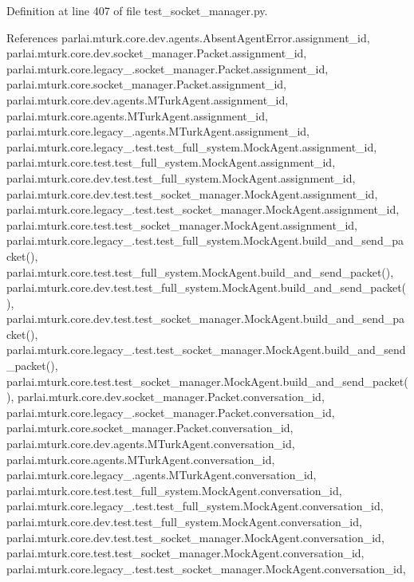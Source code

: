 Definition at line 407 of file test\+\_\+socket\+\_\+manager.\+py.



References parlai.\+mturk.\+core.\+dev.\+agents.\+Absent\+Agent\+Error.\+assignment\+\_\+id, parlai.\+mturk.\+core.\+dev.\+socket\+\_\+manager.\+Packet.\+assignment\+\_\+id, parlai.\+mturk.\+core.\+legacy\+\_.\+socket\+\_\+manager.\+Packet.\+assignment\+\_\+id, parlai.\+mturk.\+core.\+socket\+\_\+manager.\+Packet.\+assignment\+\_\+id, parlai.\+mturk.\+core.\+dev.\+agents.\+M\+Turk\+Agent.\+assignment\+\_\+id, parlai.\+mturk.\+core.\+agents.\+M\+Turk\+Agent.\+assignment\+\_\+id, parlai.\+mturk.\+core.\+legacy\+\_.\+agents.\+M\+Turk\+Agent.\+assignment\+\_\+id, parlai.\+mturk.\+core.\+legacy\+\_.\+test.\+test\+\_\+full\+\_\+system.\+Mock\+Agent.\+assignment\+\_\+id, parlai.\+mturk.\+core.\+test.\+test\+\_\+full\+\_\+system.\+Mock\+Agent.\+assignment\+\_\+id, parlai.\+mturk.\+core.\+dev.\+test.\+test\+\_\+full\+\_\+system.\+Mock\+Agent.\+assignment\+\_\+id, parlai.\+mturk.\+core.\+dev.\+test.\+test\+\_\+socket\+\_\+manager.\+Mock\+Agent.\+assignment\+\_\+id, parlai.\+mturk.\+core.\+legacy\+\_.\+test.\+test\+\_\+socket\+\_\+manager.\+Mock\+Agent.\+assignment\+\_\+id, parlai.\+mturk.\+core.\+test.\+test\+\_\+socket\+\_\+manager.\+Mock\+Agent.\+assignment\+\_\+id, parlai.\+mturk.\+core.\+legacy\+\_.\+test.\+test\+\_\+full\+\_\+system.\+Mock\+Agent.\+build\+\_\+and\+\_\+send\+\_\+packet(), parlai.\+mturk.\+core.\+test.\+test\+\_\+full\+\_\+system.\+Mock\+Agent.\+build\+\_\+and\+\_\+send\+\_\+packet(), parlai.\+mturk.\+core.\+dev.\+test.\+test\+\_\+full\+\_\+system.\+Mock\+Agent.\+build\+\_\+and\+\_\+send\+\_\+packet(), parlai.\+mturk.\+core.\+dev.\+test.\+test\+\_\+socket\+\_\+manager.\+Mock\+Agent.\+build\+\_\+and\+\_\+send\+\_\+packet(), parlai.\+mturk.\+core.\+legacy\+\_.\+test.\+test\+\_\+socket\+\_\+manager.\+Mock\+Agent.\+build\+\_\+and\+\_\+send\+\_\+packet(), parlai.\+mturk.\+core.\+test.\+test\+\_\+socket\+\_\+manager.\+Mock\+Agent.\+build\+\_\+and\+\_\+send\+\_\+packet(), parlai.\+mturk.\+core.\+dev.\+socket\+\_\+manager.\+Packet.\+conversation\+\_\+id, parlai.\+mturk.\+core.\+legacy\+\_.\+socket\+\_\+manager.\+Packet.\+conversation\+\_\+id, parlai.\+mturk.\+core.\+socket\+\_\+manager.\+Packet.\+conversation\+\_\+id, parlai.\+mturk.\+core.\+dev.\+agents.\+M\+Turk\+Agent.\+conversation\+\_\+id, parlai.\+mturk.\+core.\+agents.\+M\+Turk\+Agent.\+conversation\+\_\+id, parlai.\+mturk.\+core.\+legacy\+\_.\+agents.\+M\+Turk\+Agent.\+conversation\+\_\+id, parlai.\+mturk.\+core.\+test.\+test\+\_\+full\+\_\+system.\+Mock\+Agent.\+conversation\+\_\+id, parlai.\+mturk.\+core.\+legacy\+\_.\+test.\+test\+\_\+full\+\_\+system.\+Mock\+Agent.\+conversation\+\_\+id, parlai.\+mturk.\+core.\+dev.\+test.\+test\+\_\+full\+\_\+system.\+Mock\+Agent.\+conversation\+\_\+id, parlai.\+mturk.\+core.\+dev.\+test.\+test\+\_\+socket\+\_\+manager.\+Mock\+Agent.\+conversation\+\_\+id, parlai.\+mturk.\+core.\+test.\+test\+\_\+socket\+\_\+manager.\+Mock\+Agent.\+conversation\+\_\+id, parlai.\+mturk.\+core.\+legacy\+\_.\+test.\+test\+\_\+socket\+\_\+manager.\+Mock\+Agent.\+conversation\+\_\+id, 